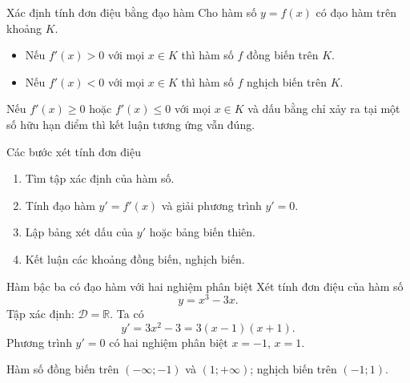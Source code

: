 \begin{dinhly}{Xác định tính đơn điệu bằng đạo hàm}
Cho hàm số $y=f(x)$ có đạo hàm trên khoảng $K$.

\begin{itemize}[leftmargin=2em]
\item Nếu $f'(x)>0$ với mọi $x\in K$ thì hàm số $f$ đồng biến trên $K$.
\item Nếu $f'(x)<0$ với mọi $x\in K$ thì hàm số $f$ nghịch biến trên $K$.
\end{itemize}

Nếu $f'(x)\ge0$ hoặc $f'(x)\le0$ với mọi $x\in K$ và dấu bằng chỉ xảy ra tại một
số hữu hạn điểm thì kết luận tương ứng vẫn đúng.
\end{dinhly}

\begin{phuongphap}{Các bước xét tính đơn điệu}
\begin{enumerate}[leftmargin=2.3em]
\item Tìm tập xác định của hàm số.
\item Tính đạo hàm $y'=f'(x)$ và giải phương trình $y'=0$.
\item Lập bảng xét dấu của $y'$ hoặc bảng biến thiên.
\item Kết luận các khoảng đồng biến, nghịch biến.
\end{enumerate}
\end{phuongphap}

\begin{vidu}{Hàm bậc ba có đạo hàm với hai nghiệm phân biệt}
Xét tính đơn điệu của hàm số
\[
y=x^3-3x.
\]
Tập xác định: $\mathcal{D}=\mathbb{R}$. Ta có
\[
y'=3x^2-3=3(x-1)(x+1).
\]
Phương trình $y'=0$ có hai nghiệm phân biệt $x=-1$, $x=1$.

\begin{center}
\end{center}

Hàm số đồng biến trên $(-\infty;-1)$ và $(1;+\infty)$; nghịch biến trên $(-1;1)$.
\end{vidu}

